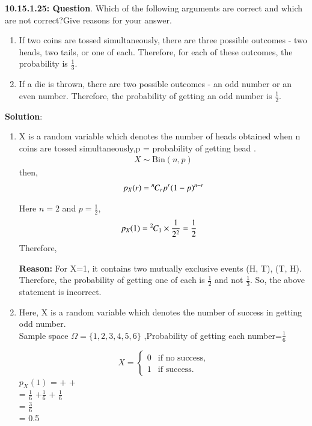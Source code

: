 \documentclass[journal,12pt,twocolumn]{IEEEtran}
\begin{document}
\textbf{10.15.1.25: Question}. Which of the following arguments are correct and which are not correct?Give reasons for your answer.
\begin{enumerate}
\item If two coins are tossed simultaneously, there are three possible outcomes - two heads, two tails, or one of each. Therefore, for each of these outcomes, the probability is $\frac{1}{3}$.

\item If a die is thrown, there are two possible outcomes - an odd number or an even number. Therefore, the probability of getting an odd number is $\frac{1}{2}$.
\end{enumerate}
\textbf{Solution}:
\begin{enumerate}
\item X is a random variable which denotes the number of heads obtained when n coins are tossed simultaneously,p = probability of getting head .\\


\begin{align}
X\sim \text{Bin}(n,p)
\end{align} 
then,
\begin{align}
	p_X(r) = {{}^{n}\mkern-1muC_{r}} p^r (1-p)^{n-r}
\end{align}

Here $n=2$ and $p=\frac{1}{2}$, 
\begin{align}
       p_X(1) &= {{}^{2}\mkern-1muC_{1}} \times \frac{1}{2^2} = \frac{1}{2}
\end{align}
Therefore,
\begin{table}[htbp]


\end{table}

\textbf{Reason:} For X=1, it contains two mutually exclusive events (H, T), (T, H). Therefore, the probability of getting one of each is $\frac{1}{2}$ and not $\frac{1}{3}$. So, the above statement is incorrect.\\

\item Here, X is a random variable which denotes the number of success in getting odd number.\\ Sample space $\Omega = \{1,2,3,4,5,6\}$ ,Probability of getting each number=$\frac{1}{6}$

\[ X = \begin{cases}
        0 & \text{if no success}, \\
        1 & \text{if success}.
      \end{cases}
\]
$p_X(1)$ =  + + \\
= $\frac{1}{6}$ +$\frac{1}{6}$ + $\frac{1}{6}$\\
= $\frac{3}{6}$\\
= 0.5
\begin{table}[htbp]


\end{table}
\end{enumerate}
\end{document}
